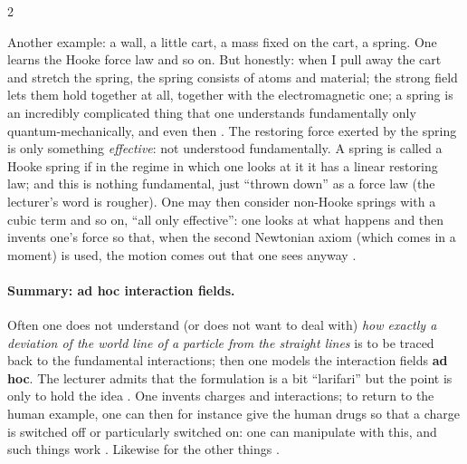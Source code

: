 \begin{paracol}{2}
\begin{example}
Another example: a wall, a little cart, a mass fixed on the cart, a spring. One learns the Hooke force law and so on. But honestly: when I pull away the cart and stretch the spring, the spring consists of atoms and material; the strong field lets them hold together at all, together with the
electromagnetic one; a spring is an incredibly complicated thing that one understands fundamentally only quantum-mechanically, and even then . The restoring force exerted by the spring is only something \emph{effective}: not understood fundamentally. A spring is called a Hooke spring if in the regime in which
one looks at it it has a linear restoring law; and this is nothing fundamental, just ``thrown down'' as a force law (the lecturer's word is rougher). One may then consider non-Hooke springs with a cubic term and so on, ``all only effective'': one looks at what happens and then invents one's force so that, when the second
Newtonian axiom (which comes in a moment) is used, the motion comes out that one sees anyway .
\end{example}

\paragraph{Summary: ad hoc interaction fields.} Often one does not understand (or does not want to deal with) \emph{how exactly a deviation of the world line of a particle from the straight lines} is to be traced back to the fundamental interactions; then one models the interaction fields \textbf{ad hoc}. The lecturer
admits that the formulation is a bit ``larifari'' but the point is only to hold the idea . One invents charges and interactions; to return to the human example, one can then for instance give the human drugs so that a charge is switched off or particularly switched on: one can manipulate with this, and such things
work . Likewise for the other things .


\end{paracol}
